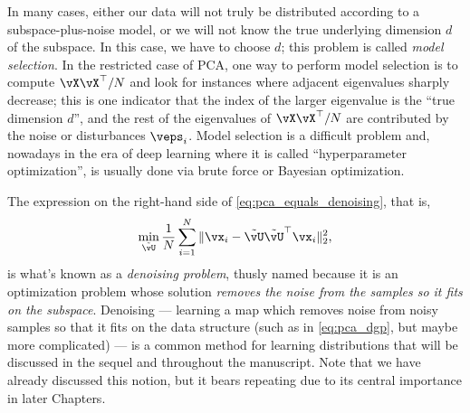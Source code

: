 \documentclass[../../book-main.tex]{subfiles}
\begin{document}
\begin{remark}
    In many cases, either our data will not truly be distributed according to a subspace-plus-noise model, or we will not know the true underlying dimension \(d\) of the subspace. In this case, we have to choose \(d\); this problem is called \textit{model selection}. In the restricted case of PCA, one way to perform model selection is to compute \(\vX\vX^{\top}/N\) and look for instances where adjacent eigenvalues sharply decrease; this is one indicator that the index of the larger eigenvalue is the ``true dimension \(d\)'', and the rest of the eigenvalues of \(\vX\vX^{\top}/N\) are contributed by the noise or disturbances \(\veps_{i}\). Model selection is a difficult problem and, nowadays in the era of deep learning where it is called ``hyperparameter optimization'', is usually done via brute force or Bayesian optimization. %
\end{remark}

\begin{remark}
    The expression on the right-hand side of \eqref{eq:pca_equals_denoising}, that is,
    \begin{equation}\label{eq:orthogonal_denoising}
        \min_{\tilde{\vU}}\frac{1}{N}\sum_{i = 1}^{N}\norm{\vx_{i} - \tilde{\vU}\tilde{\vU}^{\top}\vx_{i}}_{2}^{2},
    \end{equation}
    is what's known as a \textit{denoising problem}, thusly named because it is an optimization problem whose solution \textit{removes the noise from the samples so it fits on the subspace}. Denoising --- learning a map which removes noise from noisy samples so that it fits on the data structure (such as in \eqref{eq:pca_dgp}, but maybe  more complicated) --- is a common method for learning distributions that will be discussed in the sequel and throughout the manuscript. Note that we have already discussed this notion, but it bears repeating due to its central importance in later Chapters.
\end{remark}
\end{document}
